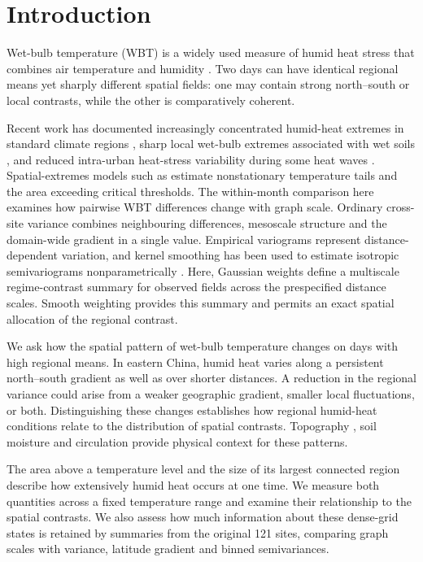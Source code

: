 \documentclass[namedate,webpdf,modern,mediumone]{oup-authoring-template}
\begin{document}
\section{Introduction}

Wet-bulb temperature (WBT) is a widely used measure of humid heat stress that
combines air temperature and humidity \citep{sherwood2010,raymond2020}. Two
days can have identical regional means yet sharply different spatial fields:
one may contain strong north--south or local contrasts, while the other is
comparatively coherent.

Recent work has documented increasingly concentrated humid-heat extremes in
standard climate regions \citep{speizer2022}, sharp local wet-bulb extremes
associated with wet soils \citep{chagnaud2025}, and reduced intra-urban
heat-stress variability during some heat waves \citep{shreevastava2023}.
Spatial-extremes models such as \citet{healy2025} estimate nonstationary
temperature tails and the area exceeding critical thresholds. The within-month
comparison here examines how pairwise WBT differences change with graph
scale. Ordinary cross-site variance combines neighbouring differences,
mesoscale structure and the domain-wide gradient in a single value. Empirical variograms represent distance-dependent
variation, and kernel smoothing has been used to estimate isotropic
semivariograms nonparametrically \citep{garciasoidan2004}. Here, Gaussian
weights define a multiscale regime-contrast summary for observed fields across
the prespecified distance scales. Smooth weighting provides this summary and
permits an exact spatial allocation of the regional contrast.

We ask how the spatial pattern of wet-bulb temperature changes on days with
high regional means. In eastern China, humid heat varies along a persistent
north--south gradient as well as over shorter distances. A reduction in the
regional variance could arise from a weaker geographic gradient, smaller
local fluctuations, or both. Distinguishing these changes establishes how
regional humid-heat conditions relate to the distribution of spatial
contrasts. Topography \citep{pepin2015}, soil moisture
\citep{seneviratne2010} and circulation \citep{horton2015} provide physical
context for these patterns.

The area above a temperature level and the size of its largest connected
region describe how extensively humid heat occurs at one time. We measure
both quantities across a fixed temperature range and examine their
relationship to the spatial contrasts. We also assess how much information
about these dense-grid states is retained by summaries from the original
121 sites, comparing graph scales with variance, latitude gradient and
binned semivariances.
\end{document}
